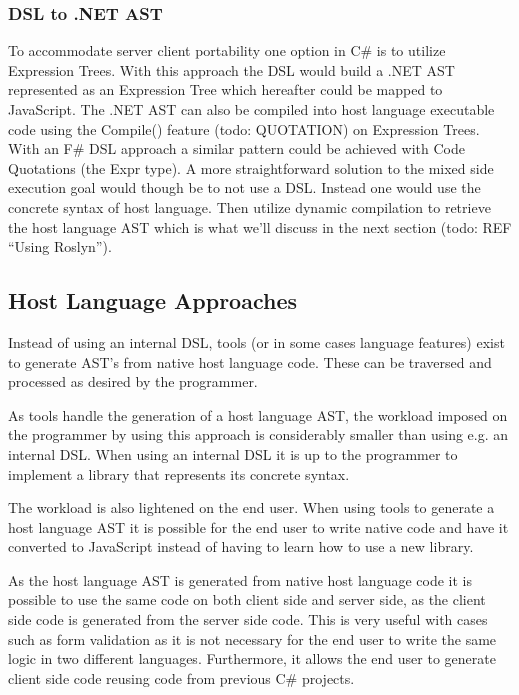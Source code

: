 		\subsubsection{DSL to .NET AST} %
		\label{sub:dsl_to_net_ast}
			To accommodate server client portability one option in C\# is to utilize Expression Trees. With this approach the DSL would build a .NET AST represented as an Expression Tree which hereafter could be mapped to JavaScript. The .NET AST can also be compiled into host language executable code using the Compile() feature (todo: QUOTATION) on Expression Trees. With an F\# DSL approach a similar pattern could be achieved with Code Quotations (the Expr type). A more straightforward solution to the mixed side execution goal would though be to not use a DSL. Instead one would use the concrete syntax of host language. Then utilize dynamic compilation to retrieve the host language AST which is what we’ll discuss in the next section (todo: REF ``Using Roslyn'').


	\subsection{Host Language Approaches} %
	\label{sub:host_language_approaches}
		Instead of using an internal DSL, tools (or in some cases language features) exist to generate AST’s from native host language code. These can be traversed and processed as desired by the programmer.

		As tools handle the generation of a host language AST, the workload imposed on the programmer by using this approach is considerably smaller than using e.g. an internal DSL. When using an internal DSL it is up to the programmer to implement a library that represents its concrete syntax.

		The workload is also lightened on the end user. When using tools to generate a host language AST it is possible for the end user to write native code and have it converted to JavaScript instead of having to learn how to use a new library.

		As the host language AST is generated from native host language code it is possible to use the same code on both client side and server side, as the client side code is generated from the server side code. This is very useful with cases such as form validation as it is not necessary for the end user to write the same logic in two different languages. Furthermore, it allows the end user to generate client side code reusing code from previous C\# projects.

